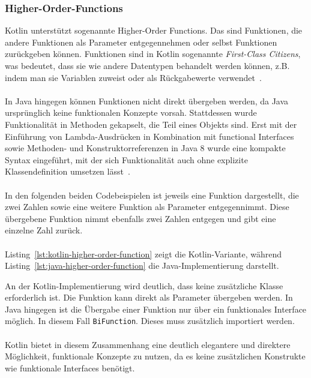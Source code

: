 \documentclass[11pt]{article}
\begin{document}
    \subsubsection{Higher-Order-Functions}
    Kotlin unterstützt sogenannte Higher-Order Functions.
    Das sind Funktionen, die andere Funktionen als Parameter entgegennehmen oder selbst Funktionen zurückgeben können.
    Funktionen sind in Kotlin sogenannte \textit{First-Class Citizens}, was bedeutet, dass sie wie andere Datentypen behandelt werden können, z.B. indem man sie Variablen zuweist oder als Rückgabewerte verwendet~\cite{kotlin-functions}.\\
    \\
    In Java hingegen können Funktionen nicht direkt übergeben werden, da Java ursprünglich keine funktionalen Konzepte vorsah.
    Stattdessen wurde Funktionalität in Methoden gekapselt, die Teil eines Objekts sind.
    Erst mit der Einführung von Lambda-Ausdrücken in Kombination mit functional Interfaces sowie Methoden- und Konstruktorreferenzen in Java 8 wurde eine kompakte Syntax eingeführt, mit der sich Funktionalität auch ohne explizite Klassendefinition umsetzen lässt~\cite[820]{insel}.\\
    \\
    In den folgenden beiden Codebeispielen ist jeweils eine Funktion dargestellt, die zwei Zahlen sowie eine weitere Funktion als Parameter entgegennimmt.
    Diese übergebene Funktion nimmt ebenfalls zwei Zahlen entgegen und gibt eine einzelne Zahl zurück.\\
    \\
    Listing~\ref{lst:kotlin-higher-order-function} zeigt die Kotlin-Variante, während Listing~\ref{lst:java-higher-order-function} die Java-Implementierung darstellt.

    An der Kotlin-Implementierung wird deutlich, dass keine zusätzliche Klasse erforderlich ist.
    Die Funktion kann direkt als Parameter übergeben werden.
    In Java hingegen ist die Übergabe einer Funktion nur über ein funktionales Interface möglich.
    In diesem Fall \texttt{BiFunction}.
    Dieses muss zusätzlich importiert werden.\\
    \\
    Kotlin bietet in diesem Zusammenhang eine deutlich elegantere und direktere Möglichkeit, funktionale Konzepte zu nutzen, da es keine zusätzlichen Konstrukte wie funktionale Interfaces benötigt.\\
    \\
\end{document}
